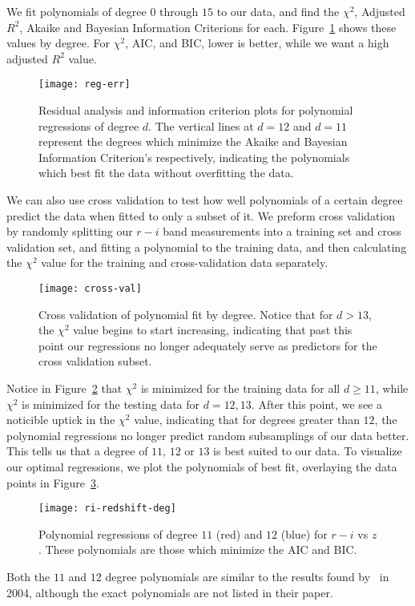 We fit polynomials of degree $0$ through $15$ to our data, and find the $\chi^2$, Adjusted $R^2$, Akaike and Bayesian Information Criterions for each. Figure~\ref{fig:reg-err} shows these values by degree. For $\chi^2$, AIC, and BIC, lower is better, while we want a high adjusted $R^2$ value.
\begin{figure}
	\texttt{[image: reg-err]}
	\caption{Residual analysis and information criterion plots for polynomial regressions of degree $d$. The vertical lines at $d = 12$ and $d = 11$ represent the degrees which minimize the Akaike and Bayesian Information Criterion's respectively, indicating the polynomials which best fit the data without overfitting the data.}
	\label{fig:reg-err}
\end{figure}

We can also use cross validation to test how well polynomials of a certain degree predict the data when fitted to only a subset of it. We preform cross validation by randomly splitting our $r - i$ band measurements into a training set and cross validation set, and fitting a polynomial to the training data, and then calculating the $\chi^2$ value for the training and cross-validation data separately.
\begin{figure}
	\texttt{[image: cross-val]}
	\caption{Cross validation of polynomial fit by degree. Notice that for $d > 13$, the $\chi^2$ value begins to start increasing, indicating that past this point our regressions no longer adequately serve as predictors for the cross validation subset.}
	\label{fig:cross-val}
\end{figure}
Notice in Figure~\ref{fig:cross-val} that $\chi^2$ is minimized for the training data for all $d \geq 11$, while $\chi^2$ is minimized for the testing data for $d = 12,13$. After this point, we see a noticible uptick in the $\chi^2$ value, indicating that for degrees greater than $12$, the polynomial regressions no longer predict random subsamplings of our data better. This tells us that a degree of $11$, $12$ or $13$ is best suited to our data. To visualize our optimal regressions, we plot the polynomials of best fit, overlaying the data points in Figure~\ref{fig:best-reg}.

\begin{figure}
	\texttt{[image: ri-redshift-deg]}
	\caption{Polynomial regressions of degree $11$ (red) and $12$ (blue) for $r - i$ vs $z$. These polynomials are those which minimize the AIC and BIC.}
	\label{fig:best-reg}
\end{figure}
Both the $11$ and $12$ degree polynomials are similar to the results found by~\citeauthor{wu2003} in 2004, although the exact polynomials are not listed in their paper.
